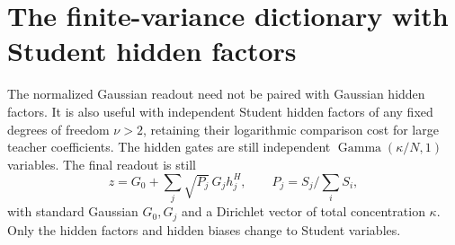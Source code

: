 \section{The finite-variance dictionary with Student hidden factors}
\label{sec:student-hidden-compression}
The normalized Gaussian readout need not be paired with Gaussian hidden factors. It is also useful with independent Student hidden factors of any fixed degrees of freedom $\nu>2$, retaining their logarithmic comparison cost for large teacher coefficients. The hidden gates are still independent $\operatorname{Gamma}(\kappa/N,1)$ variables. The final readout is still
\[
 z=G_0+\sum_j\sqrt{P_j}\,G_jh_j^H,
 \qquad P_j=S_j/\sum_iS_i,
\]
with standard Gaussian $G_0,G_j$ and a Dirichlet vector of total concentration $\kappa$. Only the hidden factors and hidden biases change to Student variables.

